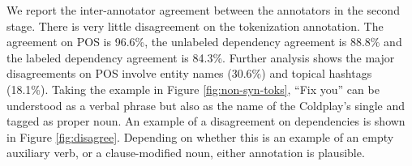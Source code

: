 \documentclass[11pt,a4paper]{article}
\newcommand{\yjcomment}[1]{\textcolor{orange}{[$_\mathrm{L}^\mathrm{Y}$#1]}}
\newcommand{\nascomment}[1]{\textcolor{blue}{[#1 ---\textsc{nas}]}}
\newcommand{\yicomment}[1]{\textcolor{gray}{[#1 ---\textsc{Yi}]}}
\begin{document}
We report the inter-annotator agreement between the annotators
in the second stage. There is very little disagreement on the
tokenization annotation. %
The agreement on POS is 96.6\%, the unlabeled
dependency agreement is 88.8\% and the labeled dependency agreement
is 84.3\%. Further analysis shows the major disagreements on POS
involve entity names (30.6\%) %
and topical hashtags (18.1\%).
Taking the example in Figure \ref{fig:non-syn-toks}, ``Fix you'' 
can
be understood as a verbal phrase but also as the name of the Coldplay's
single and tagged as proper noun. 
An example of a disagreement on
dependencies is shown in Figure \ref{fig:disagree}.  Depending on
whether this is an example of an empty auxiliary verb, or a clause-modified
noun, either annotation is plausible.
\end{document}
